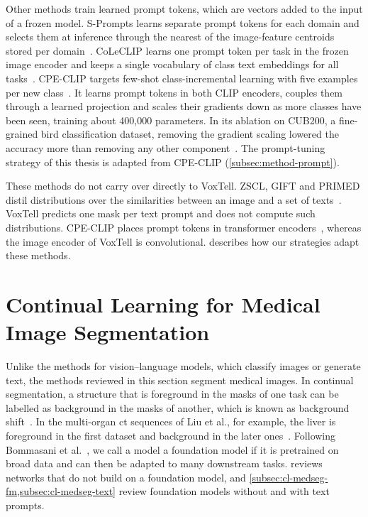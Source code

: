 Other methods train learned prompt tokens, which are vectors added to the input of a frozen model.
S-Prompts learns separate prompt tokens for each domain and selects them at inference through the nearest of the image-feature centroids stored per domain~\cite{wang2023spromptslearningpretrainedtransformers}.
CoLeCLIP learns one prompt token per task in the frozen image encoder and keeps a single vocabulary of class text embeddings for all tasks~\cite{li2024coleclipopendomaincontinuallearning}.
CPE-CLIP targets few-shot class-incremental learning with five examples per new class~\cite{D_Alessandro_2023}.
It learns prompt tokens in both CLIP encoders, couples them through a learned projection and scales their gradients down as more classes have been seen, training about 400{,}000 parameters.
In its ablation on CUB200, a fine-grained bird classification dataset, removing the gradient scaling lowered the accuracy more than removing any other component~\cite[Sec.~5.5, Fig.~2]{D_Alessandro_2023}.
The prompt-tuning strategy of this thesis is adapted from CPE-CLIP (\cref{subsec:method-prompt}).

These methods do not carry over directly to VoxTell.
ZSCL, GIFT and PRIMED distil distributions over the similarities between an image and a set of texts~\cite{zheng2023preventingzeroshottransferdegradation,wu2024gift,chen2025forgingdynamicmemoryretrievalguided}.
VoxTell predicts one mask per text prompt and does not compute such distributions.
CPE-CLIP places prompt tokens in transformer encoders~\cite{D_Alessandro_2023}, whereas the image encoder of VoxTell is convolutional.
 describes how our strategies adapt these methods.

\section[Continual Learning for Medical Image Segmentation]{Continual Learning for Medical Image\texorpdfstring{\newline}{ } Segmentation}
\label{sec:cl-medseg}

Unlike the methods for vision--language models, which classify images or generate text, the methods reviewed in this section segment medical images.
In continual segmentation, a structure that is foreground in the masks of one task can be labelled as background in the masks of another, which is known as background shift~\cite{cermelli2020modelingbackgroundincrementallearning}.
In the multi-organ \gls{ct} sequences of Liu et al., for example, the liver is foreground in the first dataset and background in the later ones~\cite{liu2022learningincrementallysegmentmultiple}.
Following Bommasani et al.~\cite[p.~3]{bommasani2021opportunities}, we call a model a foundation model if it is pretrained on broad data and can then be adapted to many downstream tasks.
 reviews networks that do not build on a foundation model, and \cref{subsec:cl-medseg-fm,subsec:cl-medseg-text} review foundation models without and with text prompts.


